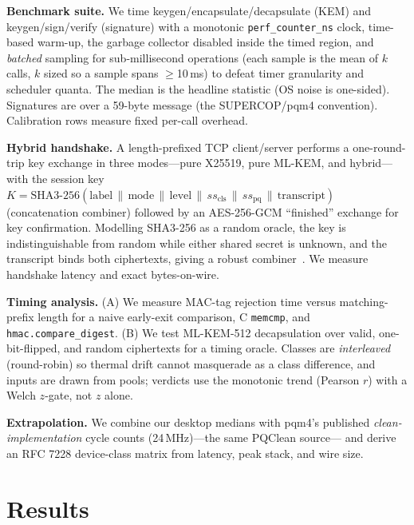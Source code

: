 \documentclass[conference]{IEEEtran}
\begin{document}
\textbf{Benchmark suite.} We time keygen/encapsulate/decapsulate (KEM) and
keygen/sign/verify (signature) with a monotonic \texttt{perf\_counter\_ns}
clock, time-based warm-up, the garbage collector disabled inside the timed
region, and \emph{batched} sampling for sub-millisecond operations (each
sample is the mean of $k$ calls, $k$ sized so a sample spans $\geq$10\,ms) to
defeat timer granularity and scheduler quanta. The median is the headline
statistic (OS noise is one-sided). Signatures are over a 59-byte message (the
SUPERCOP/pqm4 convention). Calibration rows measure fixed per-call overhead.

\textbf{Hybrid handshake.} A length-prefixed TCP client/server performs a
one-round-trip key exchange in three modes---pure X25519, pure ML-KEM, and
hybrid---with the session key $K=\mathrm{SHA3\text{-}256}(\text{label}\,\|\,
\text{mode}\,\|\,\text{level}\,\|\,ss_{\mathrm{cls}}\,\|\,ss_{\mathrm{pq}}\,\|\,
\text{transcript})$ (concatenation combiner) followed by an AES-256-GCM
``finished'' exchange for key confirmation. Modelling SHA3-256 as a random
oracle, the key is indistinguishable from random while either shared secret is
unknown, and the transcript binds both ciphertexts, giving a robust
combiner~\cite{tls13hybrid}. We measure handshake latency and exact
bytes-on-wire.

\textbf{Timing analysis.} (A) We measure MAC-tag rejection time versus
matching-prefix length for a naive early-exit comparison, C \texttt{memcmp},
and \texttt{hmac.compare\_digest}. (B) We test ML-KEM-512 decapsulation over
valid, one-bit-flipped, and random ciphertexts for a timing oracle. Classes
are \emph{interleaved} (round-robin) so thermal drift cannot masquerade as a
class difference, and inputs are drawn from pools; verdicts use the monotonic
trend (Pearson $r$) with a Welch $z$-gate, not $z$ alone.

\textbf{Extrapolation.} We combine our desktop medians with pqm4's published
\emph{clean-implementation} cycle counts (24\,MHz)---the same PQClean source---
and derive an RFC 7228 device-class matrix from latency, peak stack, and wire
size.

\section{Results}
\end{document}
